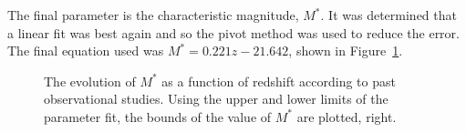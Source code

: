 			The final parameter is the characteristic magnitude, $M^*$. It was determined that a linear fit was best again and so the pivot method was used to reduce the error. The final equation used was $M^* = 0.221z - 21.642$, shown in Figure~\ref{fig:m-star_evolution}.
			\begin{figure}[!htbp]
				\begin{minipage}[c]{0.5\linewidth}
					\centering
						\begingroup{}
							\resizebox{\textwidth}{!}{%
								
							}\endgroup
				\end{minipage}
				\begin{minipage}[c]{0.5\linewidth}
					\centering
						\begingroup{}
							\resizebox{\textwidth}{!}{%
								
							}\endgroup
				\end{minipage}
				\caption{The evolution of $M^{*}$ as a function of redshift according to past observational studies. Using the upper and lower limits of the parameter fit, the bounds of the value of $M^*$ are plotted, right.\label{fig:m-star_evolution}}
			\end{figure}

